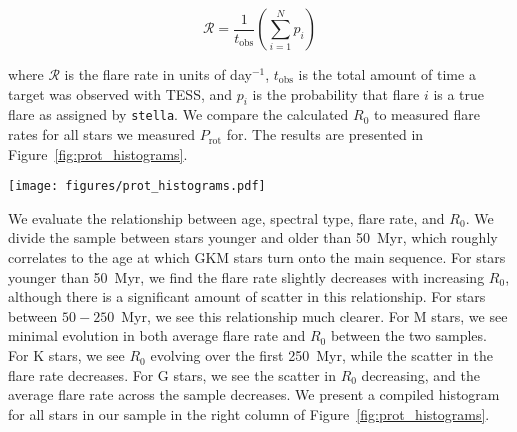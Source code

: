 \documentclass[twocolumn]{aastex631}
\begin{document}
\begin{equation}\label{eq:fr}
  \mathcal{R} = \frac{1}{t_\textrm{obs}} \left( \sum_{i=1}^{N} p_i \right)
\end{equation}

where $\mathcal{R}$ is the flare rate in units of day$^{-1}$, $t_\textrm{obs}$ is the total amount of time a target was
observed with TESS, and $p_i$ is the probability that flare $i$ is a true flare as assigned by \texttt{stella}.
We compare the calculated $R_0$ to measured flare rates for all stars we measured $P_\textrm{rot}$ for. The
results are presented in Figure~\ref{fig:prot_histograms}.

\begin{figure*}[ht!]
    \begin{centering}
        \texttt{[image: figures/prot\_histograms.pdf]}
        \caption{
            Comparison of Rossby Number, $R_0$ and flare rate for young GKM stars.
            We find no change in the average flare rate for GKM stars $< 250$\,Myr.
            We see evidence that as $R_0$ increases, the average flare rate decreases.
            This is similar to results presented in \cite{medina20}, however our sample extends this
            trend to young GKM stars, while previous results were limited to nearby M dwarfs. The top row are
            stars with ages $4.5 - 50$\,Myr; the bottom row are stars with ages $50 - 250$\,Myr. The
            histograms are colored by number of stars in each bin.
        }
        \label{fig:prot_histograms}
    \end{centering}
\end{figure*}

We evaluate the relationship between age, spectral type, flare rate, and $R_0$. We divide the sample between stars
younger and older than 50~Myr, which roughly correlates to the age at which GKM stars turn onto the main sequence.
For stars younger than 50~Myr, we find the flare rate slightly decreases with increasing $R_0$, although there is a
significant amount of scatter in this relationship. For stars between $50 - 250$~Myr, we see this relationship much
clearer. For M stars, we see minimal evolution in both average flare rate and $R_0$ between the two samples. For K
stars, we see $R_0$ evolving over the first 250~Myr, while the scatter in the flare rate decreases. For G stars, we
see the scatter in $R_0$ decreasing, and the average flare rate across the sample decreases. We present a compiled histogram
for all stars in our sample in the right column of Figure~\ref{fig:prot_histograms}.
\end{document}
